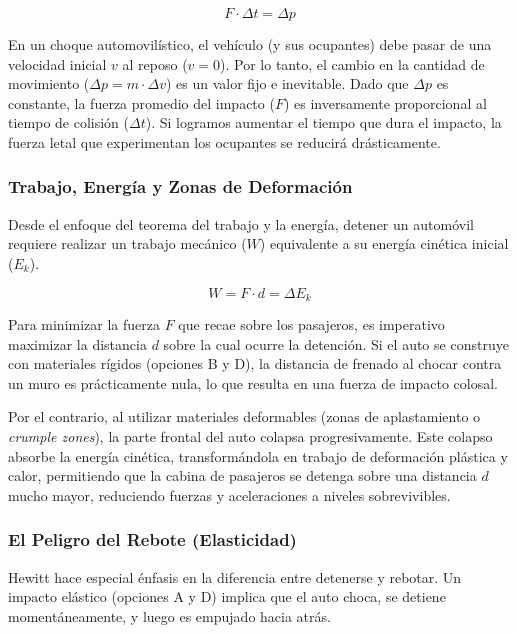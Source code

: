 \documentclass[12pt, a4paper]{article}
\begin{document}
\begin{equation}
F \cdot \Delta t = \Delta p
\end{equation}

En un choque automovilístico, el vehículo (y sus ocupantes) debe pasar de una velocidad inicial $v$ al reposo ($v=0$). Por lo tanto, el cambio en la cantidad de movimiento ($\Delta p = m \cdot \Delta v$) es un valor fijo e inevitable. Dado que $\Delta p$ es constante, la fuerza promedio del impacto ($F$) es inversamente proporcional al tiempo de colisión ($\Delta t$). Si logramos aumentar el tiempo que dura el impacto, la fuerza letal que experimentan los ocupantes se reducirá drásticamente.

\subsubsection*{Trabajo, Energía y Zonas de Deformación}

Desde el enfoque del teorema del trabajo y la energía, detener un automóvil requiere realizar un trabajo mecánico ($W$) equivalente a su energía cinética inicial ($E_k$). 

\begin{equation}
W = F \cdot d = \Delta E_k
\end{equation}

Para minimizar la fuerza $F$ que recae sobre los pasajeros, es imperativo maximizar la distancia $d$ sobre la cual ocurre la detención. Si el auto se construye con materiales rígidos (opciones B y D), la distancia de frenado al chocar contra un muro es prácticamente nula, lo que resulta en una fuerza de impacto colosal. 

Por el contrario, al utilizar materiales deformables (zonas de aplastamiento o \textit{crumple zones}), la parte frontal del auto colapsa progresivamente. Este colapso absorbe la energía cinética, transformándola en trabajo de deformación plástica y calor, permitiendo que la cabina de pasajeros se detenga sobre una distancia $d$ mucho mayor, reduciendo fuerzas y aceleraciones a niveles sobrevivibles.

\subsubsection*{El Peligro del Rebote (Elasticidad)}

Hewitt hace especial énfasis en la diferencia entre detenerse y rebotar. Un impacto elástico (opciones A y D) implica que el auto choca, se detiene momentáneamente, y luego es empujado hacia atrás. 
\end{document}
